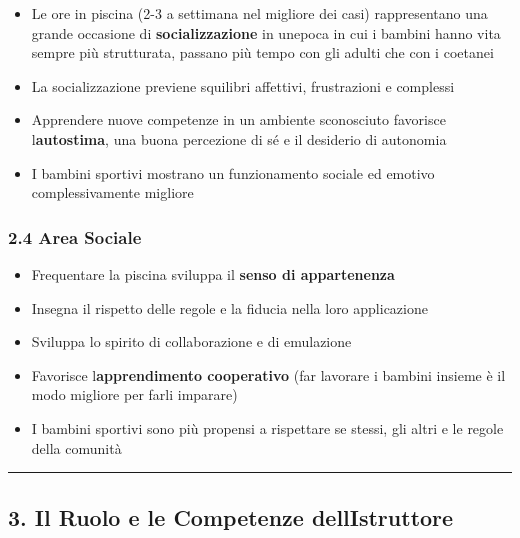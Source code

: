 \documentclass[a4paper,11pt]{article}
\providecommand{\tightlist}{%
  \setlength{\itemsep}{0pt}\setlength{\parskip}{0pt}}
\begin{document}
\begin{itemize}
      \tightlist
      \item
            Le ore in piscina (2-3 a settimana nel migliore dei casi)
            rappresentano una grande occasione di \textbf{socializzazione} in
            un\textquotesingle epoca in cui i bambini hanno vita sempre più
            strutturata, passano più tempo con gli adulti che con i coetanei
      \item
            La socializzazione previene squilibri affettivi, frustrazioni e
            complessi
      \item
            Apprendere nuove competenze in un ambiente sconosciuto favorisce
            l\textquotesingle{}\textbf{autostima}, una buona percezione di sé e il
            desiderio di autonomia
      \item
            I bambini sportivi mostrano un funzionamento sociale ed emotivo
            complessivamente migliore
\end{itemize}

\subsubsection{2.4 Area Sociale}\label{area-sociale}

\begin{itemize}
      \tightlist
      \item
            Frequentare la piscina sviluppa il \textbf{senso di appartenenza}
      \item
            Insegna il rispetto delle regole e la fiducia nella loro applicazione
      \item
            Sviluppa lo spirito di collaborazione e di emulazione
      \item
            Favorisce l\textquotesingle{}\textbf{apprendimento cooperativo} (far
            lavorare i bambini insieme è il modo migliore per farli imparare)
      \item
            I bambini sportivi sono più propensi a rispettare se stessi, gli altri
            e le regole della comunità
\end{itemize}

\begin{center}\rule{0.5\linewidth}{0.5pt}\end{center}

\subsection{3. Il Ruolo e le Competenze
      dell\textquotesingle Istruttore}\label{il-ruolo-e-le-competenze-dellistruttore}
\end{document}
